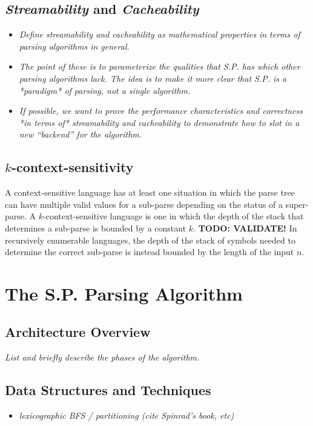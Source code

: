 \documentclass{article}
\begin{document}
\subsection{\textit{Streamability} and \textit{Cacheability}}
\begin{itemize}
  \item \textit{Define streamability and cacheability as mathematical properties in terms of parsing algorithms in general.}
  \item \textit{The point of these is to parameterize the qualities that S.P. has which other parsing algorithms lack. The idea is to make it more clear that S.P. is a *paradigm* of parsing, not a single algorithm.}
  \item \textit{If possible, we want to prove the performance characteristics and correctness *in terms of* streamability and cacheability to demonstrate how to slot in a new ``backend'' for the algorithm.}
\end{itemize}

\subsection{$k$-context-sensitivity}
A context-sensitive language has at least one situation in which the parse tree can have multiple valid values for a sub-parse depending on the status of a super-parse. A $k$-context-sensitive language is one in which the depth of the stack that determines a sub-parse is bounded by a constant $k$. \textbf{TODO: VALIDATE!} In recursively enumerable languages, the depth of the stack of symbols needed to determine the correct sub-parse is instead bounded by the length of the input $n$.

\section{The S.P. Parsing Algorithm}
\subsection{Architecture Overview}
\textit{List and briefly describe the phases of the algorithm.}

\subsection{Data Structures and Techniques}
\begin{itemize}
  \item \textit{lexicographic BFS / partitioning (cite Spinrad's book, etc)}
\end{itemize}
\end{document}
